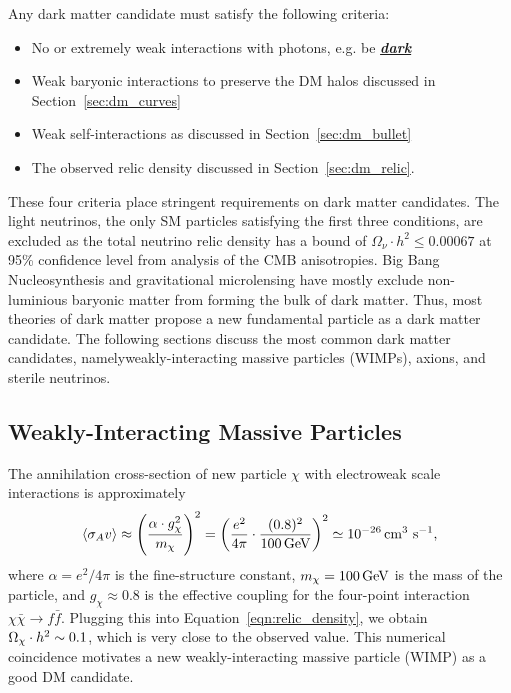 Any dark matter candidate must satisfy the following criteria:
\begin{itemize}
\item No or extremely weak interactions with photons, e.g. be \underline{\textbf{\textit{dark}}}
\item Weak baryonic interactions to preserve the DM halos discussed in Section~\ref{sec:dm_curves}
\item Weak self-interactions as discussed in Section~\ref{sec:dm_bullet}
\item The observed relic density discussed in Section~\ref{sec:dm_relic}.
\end{itemize}
These four criteria place stringent requirements on dark matter candidates.
The light neutrinos, the only SM particles satisfying the first three conditions, are excluded as the total neutrino relic density has a bound of $\Omega_\nu \cdot h^2 \leq 0.00067$ at 95\% confidence level from analysis of the CMB anisotropies.
Big Bang Nucleosynthesis and gravitational microlensing have mostly exclude non-luminious baryonic matter from forming the bulk of dark matter.
Thus, most theories of dark matter propose a new fundamental particle as a dark matter candidate.
The following sections discuss the most common dark matter candidates, namelyweakly-interacting massive particles (WIMPs), axions, and sterile neutrinos.

\subsection{Weakly-Interacting Massive Particles}
\label{sec:dm_wimp}

The annihilation cross-section of new particle $\chi$ with electroweak scale interactions is approximately
\begin{equation}
  \langle \sigma_A v \rangle \approx \left( \frac{\alpha \cdot g_\chi^2}{m_\chi} \right)^2 = \left( \frac{e^2}{4\pi} \cdot \frac{(0.8)^2}{100\,\text{Ge\hspace{-.08em}V}} \right)^2 \simeq 10^{-26} \,\text{cm}^{3}\text{ s}^{-1},
\end{equation}
where $\alpha = e^2 / 4\pi$ is the fine-structure constant, $m_\chi = 100\,\text{Ge\hspace{-.08em}V}$ is the mass of the particle, and $g_\chi \approx 0.8$ is the effective coupling for the four-point interaction $\chi \bar\chi \rightarrow f \bar f$.
Plugging this into Equation~\ref{eqn:relic_density}, we obtain $\Omega_\chi \cdot h^2 \sim 0.1$, which is very close to the observed value.
This numerical coincidence motivates a new weakly-interacting massive particle (WIMP) as a good DM candidate.

